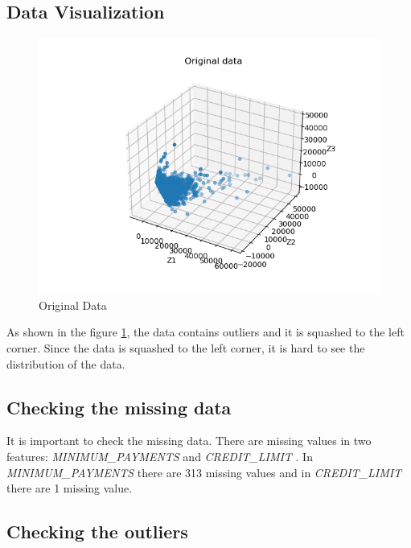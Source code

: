\documentclass{article}
\begin{document}
    \begingroup
        \subsection{Data Visualization}

        \begin{figure}[h]
            \includegraphics[scale=0.5]{original_data_vis.png}
            \caption{Original Data}
            \label{fig:original_data_vis}
        \end{figure}

        As shown in the figure \ref{fig:original_data_vis}, the data contains outliers and it is squashed to the left corner. 
        Since the data is squashed to the left corner, it is hard to see the distribution of the data.
    \endgroup

    \hfill

    \begingroup
    \subsection {Checking the missing data}

    It is important to check the missing data.
    There are missing values in two features: \textit{MINIMUM\_PAYMENTS} and \textit{CREDIT\_LIMIT }.
    In \textit{MINIMUM\_PAYMENTS} there are 313 missing values and in \textit{CREDIT\_LIMIT} there are 1 missing value.
    
    \endgroup
    
    \hfill

    \begingroup
        \subsection{Checking the outliers}
\end{document}
